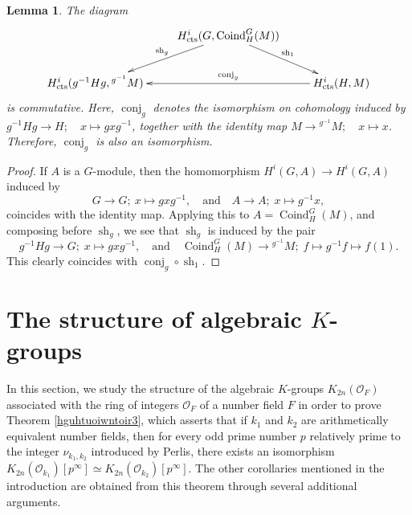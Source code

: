 \documentclass{article}
\numberwithin{equation}{section} %
\newtheorem{lemm}{Lemma}[section]
\begin{document}
        \begin{lemm}
            The diagram
        \[
          \xymatrix{
            &
            H_{\rm cts}^i(G,\operatorname{Coind}_H^G(M))
            \ar[ld]_-{\mathrm{sh}_g}
            \ar[rd]^-{\mathrm{sh}_1}
            & \\
            H_{\rm cts}^i(g^{-1}Hg,{}^{g^{-1}}M)
            &
            &
            H_{\rm cts}^i(H,M)
            \ar[ll]_-{\mathrm{conj}_g}
          }
        \]
        is commutative. Here, $\operatorname{conj}_g$ denotes the isomorphism on cohomology induced by $g^{-1}Hg \to H; \quad x \mapsto gxg^{-1}$,
        together with the identity map $M \to {}^{g^{-1}}M;
          \quad
          x \mapsto x$. Therefore, $\operatorname{conj}_g$ is also an isomorphism.
        \end{lemm}

          \begin{proof}
              If $A$ is a $G$-module, then the homomorphism $H^i(G,A)\to H^i(G,A)$ induced by
        \[
        G\to G;
        \:
        x\mapsto gxg^{-1},
        \quad
        \text{and}
        \quad
        A\to A;
        \;
        x\mapsto g^{-1}x,
        \]
        coincides with the identity map. Applying this to $A=\operatorname{Coind}_H^G(M)$, and composing before $\operatorname{sh}_g$, we see that $\operatorname{sh}_g$ is induced by the pair
        \[
          g^{-1}Hg \to G;
          \;
          x\mapsto gxg^{-1},
          \quad 
          \text{and}
          \quad 
          \operatorname{Coind}_H^G(M)
          \to
          {}^{g^{-1}}M;
          \;
          f \mapsto g^{-1}f \mapsto f(1).
        \]
        This clearly coincides with $\operatorname{conj}_g\circ \operatorname{sh}_1$.
          \end{proof}
          

        \section{The structure of algebraic $K$-groups}

In this section, we study the structure of the algebraic $K$-groups $K_{2n}(\mathcal{O}_F)$ associated with the ring of integers $\mathcal{O}_F$ of a number field $F$ in order to prove Theorem \ref{hguhtuoiwntoir3}, which asserts that if $k_1$ and $k_2$ are arithmetically equivalent number fields, then for every odd prime number $p$ relatively prime to the integer $\nu_{k_1,k_2}$ introduced by Perlis, there exists an isomorphism $K_{2n}(\mathcal{O}_{k_1})[p^\infty] \simeq K_{2n}(\mathcal{O}_{k_2})[p^\infty]$. The other corollaries mentioned in the introduction are obtained from this theorem through several additional arguments.
\end{document}
